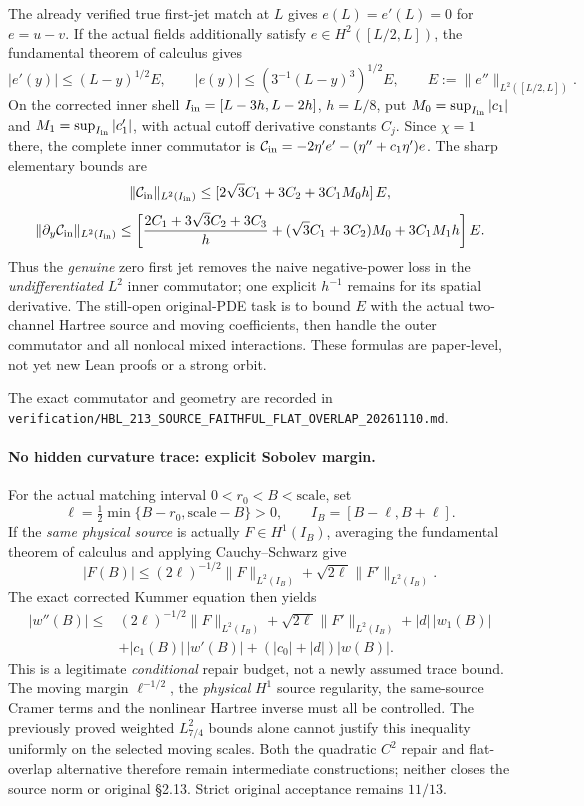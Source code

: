 \documentclass[11pt]{amsart}
\begin{document}
The already verified true first-jet match at \(L\)
gives \(e(L)=e'(L)=0\) for \(e=u-v\). If the
actual fields additionally satisfy \(e\in H^2([L/2,L])\),
the fundamental theorem of calculus gives
\[
 |e'(y)|\le(L-y)^{1/2}E,\qquad
 |e(y)|\le(3^{-1}(L-y)^3)^{1/2}E,\qquad
 E:=\|e''\|_{L^2([L/2,L])}.
\]
On the corrected inner shell
\(I_{\rm in}=[L-3h,L-2h]\), \(h=L/8\),
put \(M_0=\sup_{I_{\rm in}}|c_1|\) and
\(M_1=\sup_{I_{\rm in}}|c_1'|\),
with actual cutoff derivative constants \(C_j\).
Since \(\chi=1\) there, the complete inner commutator is
\(\mathcal C_{\rm in}=-2\eta'e'-(\eta''+c_1\eta')e\).
The sharp elementary bounds are
\[
 \|\mathcal C_{\rm in}\|_{L^2(I_{\rm in})}
 \le[2\sqrt3 C_1+3C_2+3C_1M_0h]\,E,
\]
\[
 \|\partial_y\mathcal C_{\rm in}\|_{L^2(I_{\rm in})}
 \le\left[
 \frac{2C_1+3\sqrt3 C_2+3C_3}{h}
 +(\sqrt3 C_1+3C_2)M_0+3C_1M_1h
 \right]E .
\]
Thus the \emph{genuine} zero first jet removes the
naive negative-power loss in the \emph{undifferentiated}
\(L^2\) inner commutator; one explicit \(h^{-1}\)
remains for its spatial derivative. The still-open
original-PDE task is to bound \(E\) with the actual
two-channel Hartree source and moving coefficients,
then handle the outer commutator and all nonlocal
mixed interactions. These formulas are paper-level,
not yet new Lean proofs or a strong orbit.

The exact commutator and geometry are recorded in
\texttt{verification/HBL\_213\_SOURCE\_FAITHFUL\_FLAT\_OVERLAP\_20261110.md}.


\paragraph{No hidden curvature trace: explicit Sobolev margin.}
For the actual matching interval \(0<r_0<B<\mathrm{scale}\),
set
\[
 \ell=\tfrac12\min\{B-r_0,\mathrm{scale}-B\}>0,\qquad
 I_B=[B-\ell,B+\ell].
\]
If the \emph{same physical source} is actually
\(F\in H^1(I_B)\), averaging the fundamental theorem
of calculus and applying Cauchy--Schwarz give
\[
 |F(B)|\le(2\ell)^{-1/2}\|F\|_{L^2(I_B)}
                 +\sqrt{2\ell}\|F'\|_{L^2(I_B)}.
\]
The exact corrected Kummer equation then yields
\[
\begin{aligned}
 |w''(B)|\le {}&
 (2\ell)^{-1/2}\|F\|_{L^2(I_B)}
 +\sqrt{2\ell}\|F'\|_{L^2(I_B)}
 +|d|\,|w_1(B)|\\
 &+|c_1(B)|\,|w'(B)|
 +(|c_0|+|d|)|w(B)|.
\end{aligned}
\]
This is a legitimate \emph{conditional} repair budget,
not a newly assumed trace bound. The moving margin
\(\ell^{-1/2}\), the \emph{physical} \(H^1\) source
regularity, the same-source Cramer terms and the
nonlinear Hartree inverse must all be controlled.
The previously proved weighted \(L^2_{7/4}\)
bounds alone cannot justify this inequality uniformly
on the selected moving scales. Both the quadratic
\(C^2\) repair and flat-overlap alternative therefore
remain intermediate constructions; neither closes
the source norm or original §2.13. Strict original
acceptance remains \(11/13\).
\end{document}
